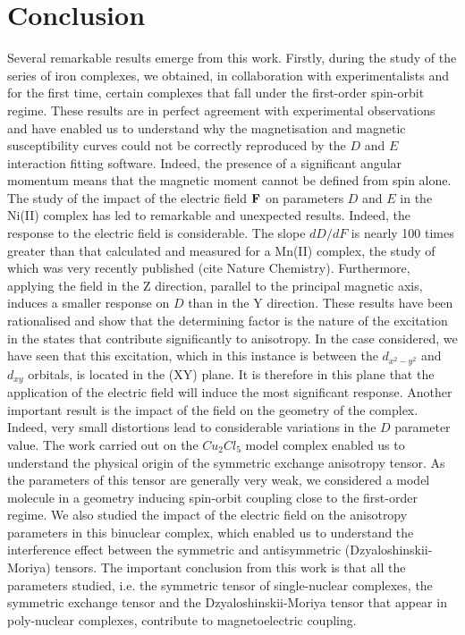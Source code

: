 \documentclass[12pt]{report}
\numberwithin{equation}{section}
\begin{document}
\chapter{Conclusion}

Several remarkable results emerge from this work. 
Firstly, during the study of the series of iron complexes, we obtained, in collaboration with experimentalists and for the first time, certain complexes that fall under the first-order spin-orbit regime.
These results are in perfect agreement with experimental observations and have enabled us to understand why the magnetisation and magnetic susceptibility curves could not be correctly reproduced by the $D$ and $E$ interaction fitting software.
Indeed, the presence of a significant angular momentum means that the magnetic moment cannot be defined from spin alone. 
The study of the impact of the electric field $\vb{F}$ on parameters $D$ and $E$ in the Ni(II) complex has led to remarkable and unexpected results.
Indeed, the response to the electric field is considerable.
The slope $dD/dF$ is nearly 100 times greater than that calculated and measured for a Mn(II) complex, the study of which was very recently published (cite Nature Chemistry).
Furthermore, applying the field in the Z direction, parallel to the principal magnetic axis, induces a smaller response on $D$ than in the Y direction.
These results have been rationalised and show that the determining factor is the nature of the excitation in the states that contribute significantly to anisotropy.
In the case considered, we have seen that this excitation, which in this instance is between the $d_{x^2-y^2}$ and $d_{xy}$ orbitals, is located in the (XY) plane.
It is therefore in this plane that the application of the electric field will induce the most significant response.
Another important result is the impact of the field on the geometry of the complex.
Indeed, very small distortions lead to considerable variations in the $D$ parameter value. 
The work carried out on the $Cu_2Cl_5$ model complex enabled us to understand the physical origin of the symmetric exchange anisotropy tensor.
As the parameters of this tensor are generally very weak, we considered a model molecule in a geometry inducing spin-orbit coupling close to the first-order regime.
We also studied the impact of the electric field on the anisotropy parameters in this binuclear complex, which enabled us to understand the interference effect between the symmetric and antisymmetric (Dzyaloshinskii-Moriya) tensors. 
The important conclusion from this work is that all the parameters studied, i.e. the symmetric tensor of single-nuclear complexes, the symmetric exchange tensor and the Dzyaloshinskii-Moriya tensor that appear in poly-nuclear complexes, contribute to magnetoelectric coupling.
\end{document}

